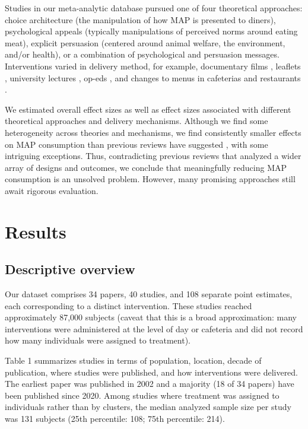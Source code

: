 \documentclass[sn-nature,referee,pdflatex]{sn-jnl}
\begin{document}
Studies in our meta-analytic database pursued one of four theoretical
approaches: choice architecture (the manipulation of how MAP is
presented to diners), psychological appeals (typically manipulations of
perceived norms around eating meat), explicit persuasion (centered
around animal welfare, the environment, and/or health), or a combination
of psychological and persuasion messages. Interventions varied in
delivery method, for example, documentary films
\citep{mathur2021effectiveness}, leaflets \citep{peacock2017},
university lectures \citep{jalil2023}, op-eds \citep{haile2021}, and
changes to menus in cafeterias \citep{andersson2021} and restaurants
\citep{coker2022, sparkman2021}.

We estimated overall effect sizes as well as effect sizes associated
with different theoretical approaches and delivery mechanisms. Although
we find some heterogeneity across theories and mechanisms, we find
consistently smaller effects on MAP consumption than previous reviews
have suggested
\citep{bianchi2018restructuring, byerly2018, chang2023, harguess2020, kwasny2022, mathur2021meta, meier2022, pandey2023},
with some intriguing exceptions. Thus, contradicting previous reviews
that analyzed a wider array of designs and outcomes, we conclude that
meaningfully reducing MAP consumption is an unsolved problem. However,
many promising approaches still await rigorous evaluation.

\section{Results}\label{sec2}

\subsection{Descriptive overview}\label{descriptive-overview}

Our dataset comprises 34 papers, 40 studies, and 108 separate point
estimates, each corresponding to a distinct intervention. These studies
reached approximately 87,000 subjects (caveat that this is a broad
approximation: many interventions were administered at the level of day
or cafeteria and did not record how many individuals were assigned to
treatment).

Table 1 summarizes studies in terms of population, location, decade of
publication, where studies were published, and how interventions were
delivered. The earliest paper was published in 2002 \citep{allen2002}
and a majority (18 of 34 papers) have been published since 2020. Among
studies where treatment was assigned to individuals rather than by
clusters, the median analyzed sample size per study was 131 subjects
(25th percentile: 108; 75th percentile: 214).
\end{document}

